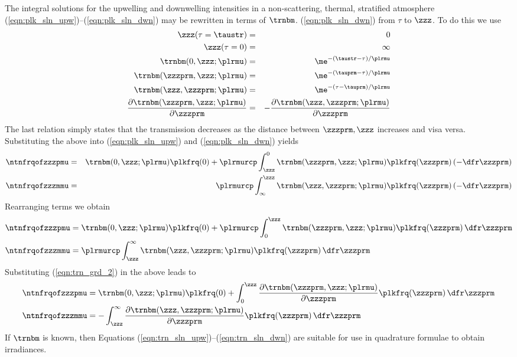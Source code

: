 \documentclass[12pt]{article}
\begin{document}
The integral solutions for the upwelling and downwelling intensities
in a non-scattering, thermal, stratified atmosphere
(\ref{eqn:plk_sln_upw})--(\ref{eqn:plk_sln_dwn}) may be rewritten in
terms of $\trnbm$. 
(\ref{eqn:plk_sln_dwn}) from $\tau$ to $\zzz$.
To do this we use
\begin{eqnarray}
\zzz(\tau = \taustr) & = & 0 \nonumber \\
\zzz(\tau = 0) & = & \infty \nonumber \\
\trnbm(0,\zzz;\plrmu) & = & \me^{-(\taustr - \tau)/\plrmu} \nonumber \\
\trnbm(\zzzprm,\zzz;\plrmu) & = & \me^{-(\tauprm - \tau)/\plrmu} \nonumber \\
\trnbm(\zzz,\zzzprm;\plrmu) & = & \me^{-(\tau - \tauprm)/\plrmu} \nonumber \\
\frac{\partial \trnbm(\zzzprm,\zzz;\plrmu)}{\partial \zzzprm} & = &
-\frac{\partial \trnbm(\zzz,\zzzprm;\plrmu)}{\partial \zzzprm} 
\end{eqnarray}
The last relation simply states that the transmission decreases as the
distance between $\zzzprm,\zzz$ increases and visa versa.
Substituting the above into (\ref{eqn:plk_sln_upw}) and
(\ref{eqn:plk_sln_dwn}) yields
\begin{eqnarray}
\ntnfrqofzzzpmu & = & 
\trnbm(0,\zzz;\plrmu) \plkfrq(0) + 
\plrmurcp \int_{\zzz}^{0} 
\trnbm(\zzzprm,\zzz;\plrmu) \plkfrq(\zzzprm) \, (-\dfr\zzzprm) 
\nonumber \\
\ntnfrqofzzzmmu & = & 
\plrmurcp \int_{\infty}^{\zzz} 
\trnbm(\zzz,\zzzprm;\plrmu) \plkfrq(\zzzprm) \, (-\dfr\zzzprm) \nonumber  
\end{eqnarray}
Rearranging terms we obtain
\begin{subequations}
\label{eqn:zzz_sln}
\begin{align}
\label{eqn:zzz_sln_upw}
\ntnfrqofzzzpmu & = 
\trnbm(0,\zzz;\plrmu) \plkfrq(0) + 
\plrmurcp \int_{0}^{\zzz} 
\trnbm(\zzzprm,\zzz;\plrmu) \plkfrq(\zzzprm) \,\dfr\zzzprm \\
\label{eqn:zzz_sln_dwn}
\ntnfrqofzzzmmu & = 
\plrmurcp \int_{\zzz}^{\infty} 
\trnbm(\zzz,\zzzprm;\plrmu) \plkfrq(\zzzprm) \,\dfr\zzzprm
\end{align}
\end{subequations} 
Substituting (\ref{eqn:trn_grd_2}) in the above leads to
\begin{subequations}
\label{eqn:trn_sln}
\begin{align}
\label{eqn:trn_sln_upw}
\ntnfrqofzzzpmu & =  
\trnbm(0,\zzz;\plrmu) \plkfrq(0) + 
\int_{0}^{\zzz} 
\frac{\partial \trnbm(\zzzprm,\zzz;\plrmu)}{\partial \zzzprm}
\plkfrq(\zzzprm) \,\dfr\zzzprm \\
\label{eqn:trn_sln_dwn}
\ntnfrqofzzzmmu & = 
- \int_{\zzz}^{\infty} 
\frac{\partial \trnbm(\zzz,\zzzprm;\plrmu)}{\partial \zzzprm}
\plkfrq(\zzzprm) \,\dfr\zzzprm
\end{align}
\end{subequations} 
If $\trnbm$ is known, then Equations
(\ref{eqn:trn_sln_upw})--(\ref{eqn:trn_sln_dwn}) are suitable for use
in quadrature formulae to obtain irradiances.
\end{document}
